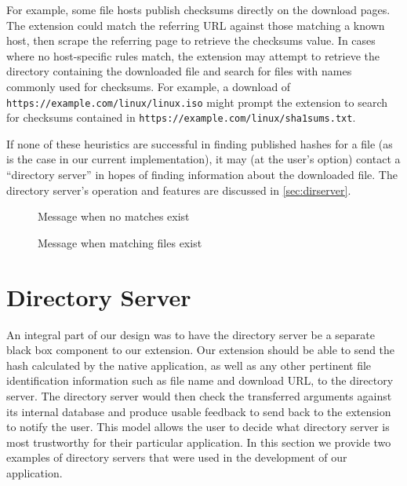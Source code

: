 \documentclass[letterpaper,twocolumn,10pt]{article}
\begin{document}
For example, some file hosts publish checksums directly on the download pages. The
extension could match the referring URL against those matching a known host, then
scrape the referring page to retrieve the checksums value. In cases where no host-specific
rules match, the extension may attempt to retrieve the directory containing the
downloaded file and search for files with names commonly used for checksums. For
example, a download of \texttt{https://example.com/linux/linux.iso} might prompt the
extension to search for checksums contained in
\texttt{https://example.com/linux/sha1sums.txt}.

If none of these heuristics are successful in finding published hashes for a file (as is
the case in our current implementation), it may (at the user's option) contact
a ``directory server'' in hopes of finding information about the downloaded file.
The directory server's operation and features are discussed in \autoref{sec:dirserver}.

\begin{figure}
    \caption{Message when no matches exist}
    \label{fig:ss-none}
\end{figure}

\begin{figure}
    \caption{Message when matching files exist}
    \label{fig:ss-match}
\end{figure}

\section{Directory Server}
\label{sec:dirserver}

An integral part of our design was to have the directory server be a separate black box component to our extension. Our extension should be able to send the hash calculated by the native application, as well as any other pertinent file identification information such as file name and download URL, to the directory server. The directory server would then check the transferred arguments against its internal database and produce usable feedback to send back to the extension to notify the user. This model allows the user to decide what directory server is most trustworthy for their particular application. In this section we provide two examples of directory servers that were used in the development of our application.
\end{document}
